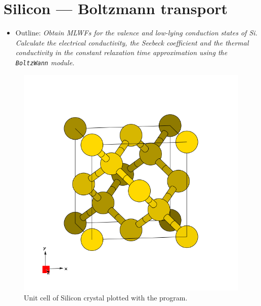 \section{Silicon --- Boltzmann transport}
\label{sec16:SiBZT}

\begin{itemize}
	\item Outline: {\it Obtain MLWFs for the valence and low-lying conduction states of Si. Calculate the electrical conductivity, the Seebeck coefficient and the thermal conductivity in the constant relaxation time approximation using the {\tt BoltzWann} module.}
\end{itemize}

\begin{figure}[h!]
\centering
\includegraphics[width=0.25\columnwidth,trim={45pt 45pt 55pt 55pt},clip]{figure/example11/silicon.png}
\caption{Unit cell of Silicon crystal plotted with the \xcrysden{} program.}
\label{fig16.0}
\end{figure}


